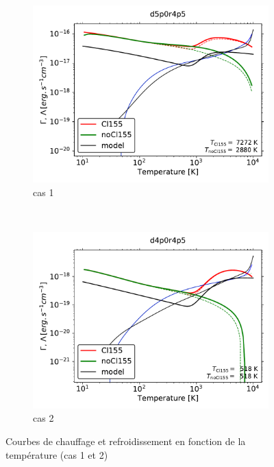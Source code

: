 \begin{figure}[!htbp]
    \centering
    \begin{subfigure}[t]{0.45\textwidth} %
        \centering \includegraphics[trim = {0 0 0 0 },clip,width=1\textwidth]{figure/Cl/particuliers/chofra_d5p0r4p5_d5p0r4p5.pdf}
        \caption{cas 1}
    \end{subfigure}
    ~ 
    \begin{subfigure}[t]{0.45\textwidth}
        \centering \includegraphics[trim = {0 0 0 0 },clip,width=1\textwidth]{figure/Cl/particuliers/chofra_d4p0r4p5_d4p0r4p5.pdf}
        \caption{cas 2}
    \end{subfigure}
    \caption{Courbes de chauffage et refroidissement en fonction de la température (cas 1 et 2)}
    \label{fig:Cl:particuliers:chofra12}
\end{figure}

